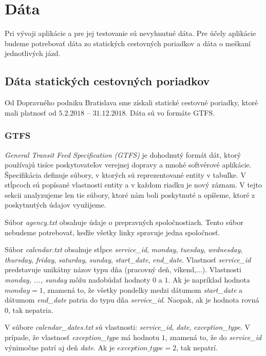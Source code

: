 \section{Dáta}
Pri vývoji aplikácie a pre jej testovanie sú nevyhnutné dáta. Pre účely aplikácie budeme potrebovať dáta zo statických cestovných poriadkov a dáta o meškaní jednotlivých jázd. 

\subsection{Dáta statických cestovných poriadkov}
Od Dopravného podniku Bratislava sme získali statické cestovné poriadky, ktoré mali platnosť od $5.2.2018$ – $31.12.2018$. Dáta sú vo formáte GTFS. 

\subsubsection{GTFS}
\label{sec:gtfs}
\textit{General Transit Feed Specification (GTFS)} je dohodnutý formát dát, ktorý používajú tisíce poskytovateľov verejnej dopravy a mnohé softvérové aplikácie. Špecifikácia definuje súbory, v ktorých sú reprezentované entity v tabuľke. V stĺpcoch sú popísané vlastnosti entity a v každom riadku je nový záznam. V tejto sekcii analyzujeme len tie súbory, ktoré nám boli poskytnuté a opíšeme, ktoré z poskytnutých údajov využijeme.

Súbor \textit{agency.txt} obsahuje údaje o prepravných spoločnostiach. Tento súbor nebudeme potrebovať, keďže všetky linky spravuje jedna spoločnosť. 

Súbor \textit{calendar.txt} obsahuje stĺpce \textit{service\_id}, \textit{monday}, \textit{tuesday}, \textit{wednesday}, \textit{thursday}, \textit{friday}, \textit{saturday}, \textit{sunday}, \textit{start\_date}, \textit{end\_date}. Vlastnosť \textit{service\_id} predstavuje unikátny názov typu dňa (pracovný deň, víkend,...). Vlastnosti \textit{monday, ..., sunday} môžu nadobúdať hodnoty $0$ a $1$. Ak je napríklad hodnota $monday = 1$, znamená to, že všetky pondelky medzi dátumom \textit{start\_date} a dátumom \textit{end\_date} patria do typu dňa \textit{service\_id}. Naopak, ak je hodnota rovná $0$, tak nepatria. 

V súbore \textit{calendar\_dates.txt} sú vlastnosti: \textit{service\_id}, \textit{date}, \textit{exception\_type}. V prípade, že vlastnosť \textit{exception\_type} má hodnotu $1$, znamená to, že do \textit{service\_id} výnimočne patrí aj deň \textit{date}. Ak je $exception\_type = 2$, tak nepatrí.

